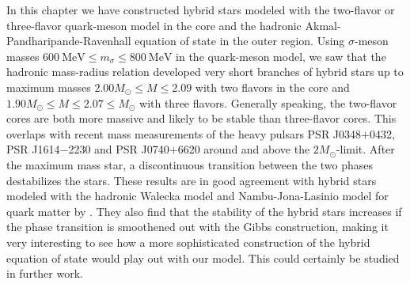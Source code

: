 In this chapter we have constructed hybrid stars modeled with the two-flavor or three-flavor quark-meson model in the core
and the hadronic Akmal-Pandharipande-Ravenhall equation of state in the outer region.
Using $\sigma$-meson masses $\SI{600}{\mega\electronvolt} \leq m_\sigma \leq \SI{800}{\mega\electronvolt}$ in the quark-meson model,
we saw that the hadronic mass-radius relation developed very short branches of hybrid stars
up to maximum masses $2.00 M_\odot \leq M \leq 2.09$ with two flavors in the core
and $1.90 M_\odot \leq M \leq 2.07 \leq M_\odot$ with three flavors.
Generally speaking, the two-flavor cores are both more massive and likely to be stable than three-flavor cores.
This overlaps with recent mass measurements of the heavy pulsars PSR J0348$+$0432, PSR J1614$-$2230 and PSR J0740$+$6620 around and above the $2 M_\odot$-limit.
After the maximum mass star, a discontinuous transition between the two phases destabilizes the stars.
These results are in good agreement with hybrid stars modeled with the hadronic Walecka model and Nambu-Jona-Lasinio model for quark matter by \cite{ref:hybrid_stars_njl}.
They also find that the stability of the hybrid stars increases if the phase transition is smoothened out with the Gibbs construction,
making it very interesting to see how a more sophisticated construction of the hybrid equation of state would play out with our model.
This could certainly be studied in further work.
